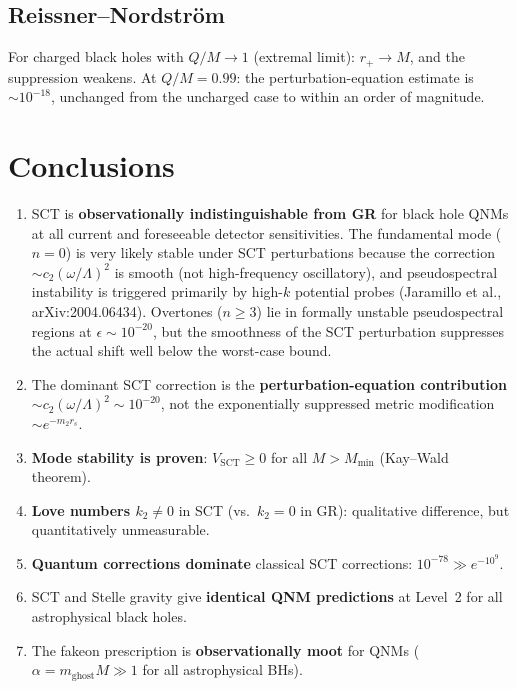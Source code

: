 \documentclass[11pt,a4paper]{article}
\newcommand{\Mmin}{M_{\mathrm{min}}}
\begin{document}
\subsection{Reissner--Nordstr\"om}

For charged black holes with $Q/M \to 1$ (extremal limit):
$r_+ \to M$, and the suppression weakens. At $Q/M = 0.99$:
the perturbation-equation estimate is $\sim 10^{-18}$, unchanged from
the uncharged case to within an order of magnitude.

\section{Conclusions}\label{sec:conclusions}

\begin{enumerate}
\item SCT is \textbf{observationally indistinguishable from GR} for
black hole QNMs at all current and foreseeable detector sensitivities.
The fundamental mode ($n=0$) is very likely stable under SCT perturbations
because the correction $\sim c_2(\omega/\Lambda)^2$ is smooth
(not high-frequency oscillatory), and pseudospectral instability
is triggered primarily by high-$k$ potential probes
(Jaramillo et al., arXiv:2004.06434). Overtones ($n \geq 3$) lie
in formally unstable pseudospectral regions at $\epsilon \sim 10^{-20}$,
but the smoothness of the SCT perturbation suppresses the actual shift
well below the worst-case bound.

\item The dominant SCT correction is the \textbf{perturbation-equation contribution}
$\sim c_2(\omega/\Lambda)^2 \sim 10^{-20}$, not the exponentially suppressed
metric modification $\sim e^{-m_2 r_s}$.

\item \textbf{Mode stability is proven}: $V_{\mathrm{SCT}} \geq 0$ for all
$M > \Mmin$ (Kay--Wald theorem).

\item \textbf{Love numbers $k_2 \neq 0$} in SCT (vs.\ $k_2 = 0$ in GR):
qualitative difference, but quantitatively unmeasurable.

\item \textbf{Quantum corrections dominate} classical SCT corrections:
$10^{-78} \gg e^{-10^9}$.

\item SCT and Stelle gravity give \textbf{identical QNM predictions}
at Level~2 for all astrophysical black holes.

\item The fakeon prescription is \textbf{observationally moot} for QNMs
($\alpha = m_{\mathrm{ghost}} M \gg 1$ for all astrophysical BHs).
\end{enumerate}
\end{document}
